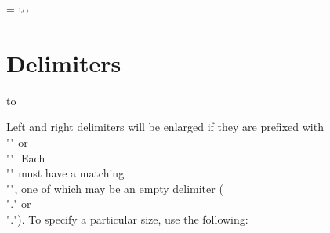 \tabskip=\centering
\paralign to
\endgroup

\section{Delimiters}

\paralign to

\begintext
Left and right delimiters will be enlarged if they are prefixed with
\\"\left" or \\"\right". Each \\"\left" must have a matching \\"\right", one of
which may be an empty delimiter (\\"\left." or \\"\right.").
To specify a particular size, use the following:
\endtext

